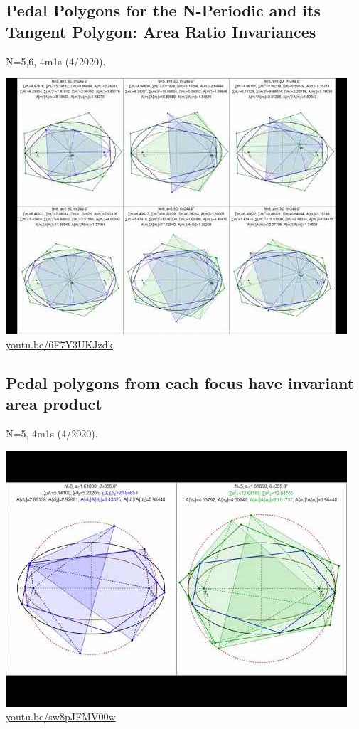 \documentclass[12pt]{amsart}
\begin{document}
\subsection{Pedal Polygons for the N-Periodic and its Tangent Polygon: Area Ratio Invariances}
\label{vid:6F7Y3UKJzdk}
\noindent N=5,6, 4m1s (4/2020). 
\begin{center}\includegraphics[width=.5\textwidth]{pics/6F7Y3UKJzdk.jpg} \\ 
\href{https://youtu.be/6F7Y3UKJzdk}{\url{youtu.be/6F7Y3UKJzdk}}\end{center}
% 

\subsection{Pedal polygons from each focus have invariant area product}
\label{vid:sw8pJFMV00w}
\noindent N=5, 4m1s (4/2020). 
\begin{center}\includegraphics[width=.5\textwidth]{pics/sw8pJFMV00w.jpg} \\ 
\href{https://youtu.be/sw8pJFMV00w}{\url{youtu.be/sw8pJFMV00w}}\end{center}
% 
\end{document}
